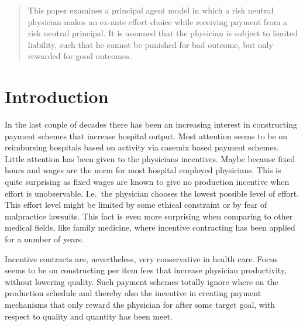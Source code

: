 


\maketitle
\begin{abstract}
This paper examines a principal agent model in which a risk neutral physician makes an ex-ante effort choice while receiving payment from a risk neutral
principal. It is assumed that the physician is subject to limited liability, such
that he cannot be punished for bad outcome, but only rewarded for good outcomes.

\end{abstract}

\section{Introduction} %
\label{sec:introduction}
In the last couple of decades there has been an increasing interest in constructing payment schemes that increase hospital output. Most attention seems to be on reimbursing hospitals based on activity via casemix based payment schemes. Little attention has been given to the physicians incentives. Maybe because fixed hours and wages are the norm for most hospital employed physicians. This is quite surprising as fixed wages are known to give no production incentive when effort is unobservable.  I.e.\ the physician chooses the lowest possible level of effort. This effort level might be limited by some ethical constraint or by fear of malpractice lawsuits. This fact is even more surprising when comparing to other medical fields, like family medicine, where incentive contracting has been applied for a number of years. 

Incentive contracts are, nevertheless, very conservative in health care. Focus seems to be on constructing per item fees that increase physician productivity, without lowering quality. Such payment schemes totally ignore where on the production schedule and thereby also the incentive in creating payment mechanisms that only reward the physician for after some target goal, with respect to quality and quantity has been meet. 

